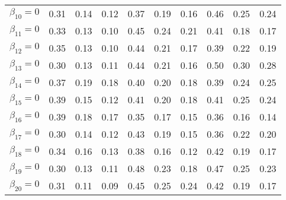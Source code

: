 \begin{table}[htbp]
\begin{tabular}{l|ccc|ccc|ccc}
  $\beta_{10}=0$ & 0.31 & 0.14 & 0.12 & 0.37 & 0.19 & 0.16 & 0.46 & 0.25 & 0.24 \\ 
  $\beta_{11}=0$ & 0.33 & 0.13 & 0.10 & 0.45 & 0.24 & 0.21 & 0.41 & 0.18 & 0.17 \\ 
  $\beta_{12}=0$ & 0.35 & 0.13 & 0.10 & 0.44 & 0.21 & 0.17 & 0.39 & 0.22 & 0.19 \\ 
  $\beta_{13}=0$ & 0.30 & 0.13 & 0.11 & 0.44 & 0.21 & 0.16 & 0.50 & 0.30 & 0.28 \\ 
  $\beta_{14}=0$ & 0.37 & 0.19 & 0.18 & 0.40 & 0.20 & 0.18 & 0.39 & 0.24 & 0.25 \\ 
  $\beta_{15}=0$ & 0.39 & 0.15 & 0.12 & 0.41 & 0.20 & 0.18 & 0.41 & 0.25 & 0.24 \\ 
  $\beta_{16}=0$ & 0.39 & 0.18 & 0.17 & 0.35 & 0.17 & 0.15 & 0.36 & 0.16 & 0.14 \\ 
  $\beta_{17}=0$ & 0.30 & 0.14 & 0.12 & 0.43 & 0.19 & 0.15 & 0.36 & 0.22 & 0.20 \\ 
  $\beta_{18}=0$ & 0.34 & 0.16 & 0.13 & 0.38 & 0.16 & 0.12 & 0.42 & 0.19 & 0.17 \\ 
  $\beta_{19}=0$ & 0.30 & 0.13 & 0.11 & 0.48 & 0.23 & 0.18 & 0.47 & 0.25 & 0.23 \\ 
  $\beta_{20}=0$ & 0.31 & 0.11 & 0.09 & 0.45 & 0.25 & 0.24 & 0.42 & 0.19 & 0.17 \\ 
\hline
\end{tabular}
\label{tab:rmseP20a}
\end{table}


